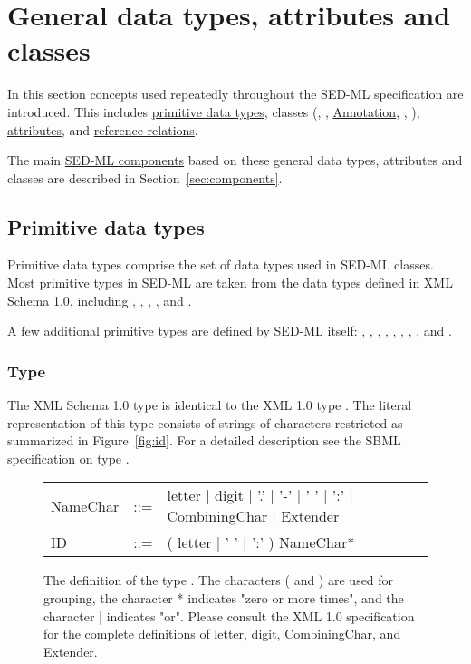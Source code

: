 \section{General data types, attributes and classes}
In this section concepts used repeatedly throughout the SED-ML specification are introduced. This includes  \hyperref[sec:dataTypes]{primitive data types}, classes (\SedBase, \Notes, \hyperref[class:notes]{Annotation}, \Parameter, \Variable), \hyperref[sec:generalAttributes]{attributes}, and \hyperref[sec:reference]{reference relations}.

The main \hyperref[sec:components]{SED-ML components} based on these general data types, attributes and classes are described in Section~\ref{sec:components}.

\subsection{Primitive data types}
\label{sec:dataTypes}
Primitive data types comprise the set of data types used in SED-ML classes. Most primitive types in SED-ML are taken from the data types defined in XML Schema 1.0, including , , , ,  and . 

A few additional primitive types are defined by SED-ML itself: \hyperref[type:id]{}, \SId, \SIdRef, \hyperref[type:target]{}, \hyperref[type:xpath]{}, \hyperref[type:mathml]{}, \hyperref[type:anyURI]{}, \hyperref[type:numlsid]{}, and \hyperref[type:numlsidref]{}.

\subsubsection[\element{ID}]{Type }
\label{type:id}
The XML Schema 1.0 type  is identical to the XML 1.0 type . The literal representation of this type consists of strings of characters restricted as summarized in Figure~\vref{fig:id}. For a detailed description see the SBML specification on type  \citep{HBH+10}.

\begin{figure}[hbt]
  \ttfamily
  \small
  \centering
  \begin{tabular}{lll}
    NameChar & ::= & letter | digit | '.' | '-' | ' ' | ':' | CombiningChar | Extender\\
    ID    & ::= & ( letter | ' ' | ':' ) NameChar*\\
  \end{tabular}
  \vspace*{-1ex}
  \caption{The definition of the type . The characters ( and ) are used for grouping, the character * indicates "zero or more times", and the character | indicates "or". Please consult the XML 1.0 specification for the complete definitions of letter, digit, CombiningChar, and Extender.}
  \label{fig:id}
\end{figure}

